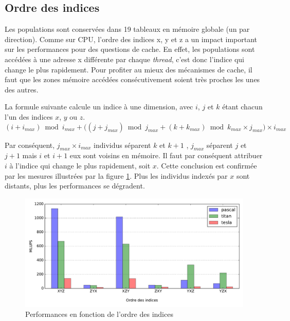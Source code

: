 \subsection{Ordre des indices}

Les populations sont conservées dans 19 tableaux en mémoire globale (un par direction). Comme sur \acs{CPU}, l'ordre des indices x, y et z a un impact important sur les performances pour des questions de cache. En effet, les populations sont accédées à une adresse x différente par chaque \textit{thread}, c'est donc l'indice qui change le plus rapidement. Pour profiter au mieux des mécanismes de cache, il faut que les zones mémoire accédées consécutivement soient très proches les unes des autres.

La formule suivante calcule un indice à une dimension, avec $i$, $j$ et $k$ étant chacun l'un des indices $x$, $y$ ou $z$.
\begin{equation}
(i+i_{max}) \bmod i_{max} + \Big((j+j_{max}) \bmod j_{max} + ( k+k_{max}) \bmod k_{max} \times j_{max}\Big) \times i_{max} 
\end{equation}

Par conséquent, $j_{max} \times i_{max}$ individus séparent $k$ et $k+1$ , $j_{max}$ séparent $j$ et $j+1$ mais $i$ et $i+1$ eux sont voisins en mémoire. Il faut par conséquent attribuer $i$ à l'indice qui change le plus rapidement, soit $x$. Cette conclusion est confirmée par les mesures illustrées par la figure \ref{fig:index_order}. Plus les individus indexés par $x$ sont distants, plus les performances se dégradent.
 
\begin{figure}[H]
	\centering
	\includegraphics[fbox, scale=0.61]{images/perfs/lbm_simple_lbmcuda/index_order.pdf}
	\caption{Performances en fonction de l'ordre des indices}
	\label{fig:index_order}
\end{figure}

